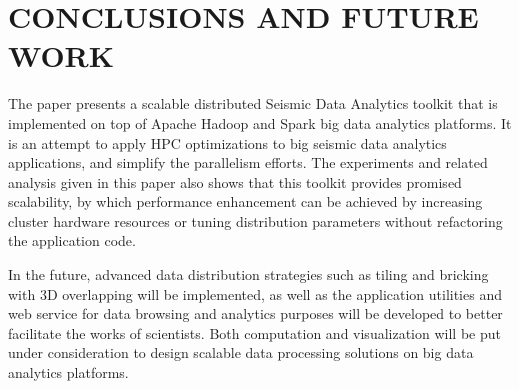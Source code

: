 %
%
%



\chapter{\uppercase{Conclusions and Future Work}}

The paper presents a scalable distributed Seismic Data Analytics toolkit that is implemented on top of Apache Hadoop and Spark big data analytics platforms. It is an attempt to apply HPC optimizations to big seismic data analytics applications, and simplify the parallelism efforts. The experiments and related analysis given in this paper also shows that this toolkit provides promised scalability, by which performance enhancement can be achieved by increasing cluster hardware resources or tuning distribution parameters without refactoring the application code.

In the future, advanced data distribution strategies such as tiling and bricking with 3D overlapping will be implemented, as well as the application utilities and web service for data browsing and analytics purposes will be developed to better facilitate the works of scientists. Both computation and visualization will be put under consideration to design scalable data processing solutions on big data analytics platforms.





